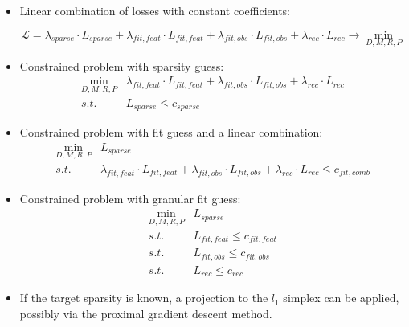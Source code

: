 \documentclass[a4paper,11pt,oneside]{report}
\begin{document}
\begin{itemize}
    \item Linear combination of losses with constant coefficients:

    \begin{equation}
    \label{eq:opt_scheme_linear_comb}
    \mathcal L=\lambda_{sparse}\cdot L_{sparse}+\lambda_{fit,feat}\cdot L_{fit, feat}+\lambda_{fit,obs}\cdot L_{fit, obs}+\lambda_{rec}\cdot L_{rec}\to\min\limits_{D,M,R,P}
    \end{equation}

    \item Constrained problem with sparsity guess:
    \begin{equation}
    \label{eq:opt_scheme_sparsity_guess}
    \begin{array}{ll}
    \min\limits_{D,M,R,P}& \lambda_{fit,feat}\cdot L_{fit, feat}+\lambda_{fit,obs}\cdot L_{fit, obs}+\lambda_{rec}\cdot L_{rec}\\
    s.t.& L_{sparse}\leq c_{sparse}
    \end{array}
    \end{equation}

    \item Constrained problem with fit guess and a linear combination:
    \begin{equation}
    \label{eq:opt_scheme_fit_guess_lin_comb}
    \begin{array}{ll}
    \min\limits_{D,M,R,P}& L_{sparse}\\
    s.t.&\lambda_{fit,feat}\cdot L_{fit, feat}+\lambda_{fit,obs}\cdot L_{fit, obs}+\lambda_{rec}\cdot L_{rec} \leq c_{fit, comb}
    \end{array}
    \end{equation}

    \item Constrained problem with granular fit guess:
    \begin{equation}
    \label{eq:opt_scheme_fit_guess_granular}
    \begin{array}{ll}
    \min\limits_{D,M,R,P}& L_{sparse}\\
    s.t.&L_{fit, feat}\leq c_{fit, feat}\\
    s.t.&L_{fit, obs}\leq c_{fit, obs}\\
    s.t.&L_{rec}\leq c_{rec}
    \end{array}
    \end{equation}

    \item If the target sparsity is known, a projection\cite{DasGupta} to the $l_1$ simplex can be applied, possibly via the proximal gradient descent method\cite{Deleu2015}.
\end{itemize}
\end{document}
